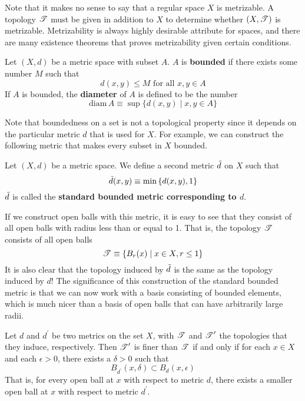   Note that it makes no sense to say that a regular space $X$ is metrizable. A topology $\operatorname{\mathscr{T}}$ must be given in addition to $X$ to determine whether $(X, \operatorname{\mathscr{T}})$ is metrizable. Metrizability is always highly desirable attribute for spaces, and there are many existence theorems that proves metrizability given certain conditions. 

  \begin{definition}
  Let $(X, d)$ be a metric space with subset $A$. $A$ is \textbf{bounded} if there exists some number $M$ such that
  \[d (x, y) \leq M \text{ for all } x,y \in A\]
  If $A$ is bounded, the \textbf{diameter} of $A$ is defined to be the number
  \[\text{diam}\, A \equiv \sup{\{d(x, y) \; | \; x, y \in A\}}\]
  \end{definition}

  Note that boundedness on a set is not a topological property since it depends on the particular metric $d$ that is used for $X$. For example, we can construct the following metric that makes every subset in $X$ bounded. 

  \begin{definition}
  Let $(X, d)$ be a metric space. We define a second metric $\Tilde{d}$ on $X$ such that
  \[\Tilde{d} (x, y) \equiv \min{\{d(x, y), 1\}}\]
  $\Tilde{d}$ is called the \textbf{standard bounded metric corresponding to $d$}. 
  \end{definition}

  If we construct open balls with this metric, it is easy to see that they consist of all open balls with radius less than or equal to 1. That is, the topology $\operatorname{\mathscr{T}}$ consists of all open balls
  \[\operatorname{\mathscr{T}} \equiv \{B_r (x) \; | \; x \in X, r \leq 1\}\]
  It is also clear that the topology induced by $\Tilde{d}$ is the same as the topology induced by $d$! The significance of this construction of the standard bounded metric is that we can now work with a basis consisting of bounded elements, which is much nicer than a basis of open balls that can have arbitrarily large radii.  

  \begin{lemma}
  Let $d$ and $d^\prime$ be two metrics on the set $X$, with $\operatorname{\mathscr{T}}$ and $\operatorname{\mathscr{T}}^\prime$ the topologies that they induce, respectively. Then $\operatorname{\mathscr{T}}^\prime$ is finer than $\operatorname{\mathscr{T}}$ if and only if for each $x \in X$ and each $\epsilon > 0$, there exists a $\delta > 0$ such that
  \[B_{d^\prime} (x, \delta) \subset B_d (x, \epsilon)\]
  That is, for every open ball at $x$ with respect to metric $d$, there exists a smaller open ball at $x$ with respect to metric $d^\prime$. 
  \end{lemma}

